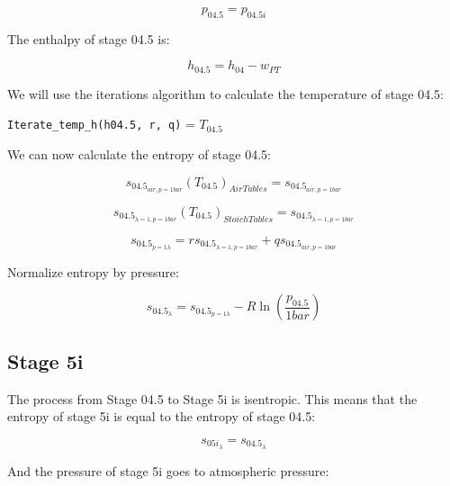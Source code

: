 \documentclass[titlepage]{article}
\begin{document}
    \begin{equation}
        p_{04.5} = p_{04.5i}
    \end{equation}

    The enthalpy of stage 04.5 is:

    \begin{equation}
        h_{04.5} = h_{04} - w_{PT}
    \end{equation}

    We will use the iterations algorithm to calculate the temperature of stage 04.5:

    \begin{center}
        \verb|Iterate_temp_h(h04.5, r, q)| = $T_{04.5}$
    \end{center}

    We can now calculate the entropy of stage 04.5:

    \begin{equation}
        s_{04.5_{air, p= 1 bar}}(T_{04.5})_{Air Tables} = s_{04.5_{air, p=1 bar}}
    \end{equation}

    \begin{equation}
        s_{04.5_{\lambda=1, p= 1 bar}}(T_{04.5})_{Stoich  Tables} = s_{04.5_{\lambda=1, p = 1 bar}}
    \end{equation}

    \begin{equation}
        s_{04.5_{p=1 \lambda}} = r s_{04.5_{\lambda=1, p=1 bar}} + q s_{04.5_{air, p=1 bar}}
    \end{equation}

    Normalize entropy by pressure:

    \begin{equation}
        s_{04.5_{\lambda}} = s_{04.5_{p=1 \lambda}} - R \ln \left( \frac{p_{04.5}}{1 bar} \right)
    \end{equation}


    \subsection{Stage 5i}
    The process from Stage 04.5 to Stage 5i is isentropic. This means that the entropy of stage 5i is equal to the entropy of stage 04.5:

    \begin{equation}
        s_{05i_{\lambda}} = s_{04.5_{\lambda}}
    \end{equation}

    And the pressure of stage 5i goes to atmospheric pressure:
\end{document}
